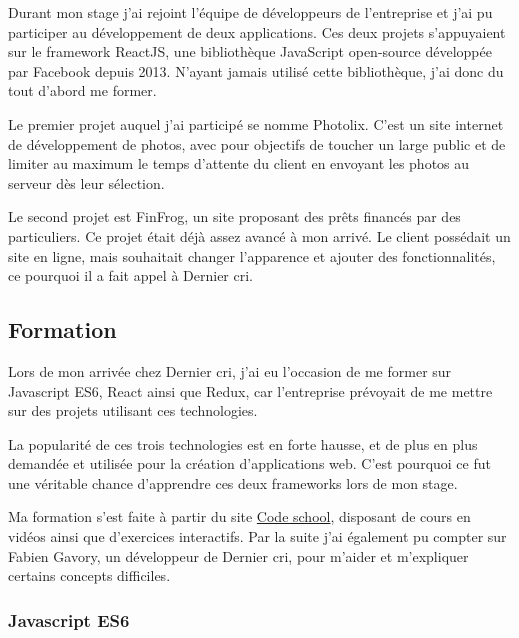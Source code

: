 \documentclass[12pt,a4paper]{article}
\begin{document}
  Durant mon stage j'ai rejoint l'équipe de développeurs de l'entreprise
  et j'ai pu participer au développement de deux applications. Ces deux
  projets s'appuyaient sur le framework ReactJS, une bibliothèque
  JavaScript open-source développée par Facebook depuis 2013. N'ayant
  jamais utilisé cette bibliothèque, j'ai donc du tout d'abord me former.

  \bigskip

  Le premier projet auquel j'ai participé se nomme Photolix. C'est un site
  internet de développement de photos, avec pour objectifs de toucher un
  large public et de limiter au maximum le temps d'attente du client en
  envoyant les photos au serveur dès leur sélection.

  \bigskip

  Le second projet est FinFrog, un site proposant des prêts financés par
  des particuliers. Ce projet était déjà assez avancé à mon arrivé. Le
  client possédait un site en ligne, mais souhaitait changer l'apparence
  et ajouter des fonctionnalités, ce pourquoi il a fait appel à Dernier
  cri.

  \bigskip

  \subsection{Formation}\label{formation}

  \bigskip

  Lors de mon arrivée chez Dernier cri, j'ai eu l'occasion de me former
  sur Javascript ES6, React ainsi que Redux, car l'entreprise prévoyait de
  me mettre sur des projets utilisant ces technologies.

  \bigskip

  La popularité de ces trois technologies est en forte hausse, et de plus
  en plus demandée et utilisée pour la création d'applications web. C'est
  pourquoi ce fut une véritable chance d'apprendre ces deux frameworks
  lors de mon stage.

  \bigskip

  Ma formation s'est faite à partir du site
  \href{https://www.codeschool.com/}{Code school}, disposant de cours en
  vidéos ainsi que d'exercices interactifs. Par la suite j'ai également pu
  compter sur Fabien Gavory, un développeur de Dernier cri, pour m'aider
  et m'expliquer certains concepts difficiles.

  \bigskip

  \subsubsection{Javascript ES6}\label{javascript-es6}
\end{document}
